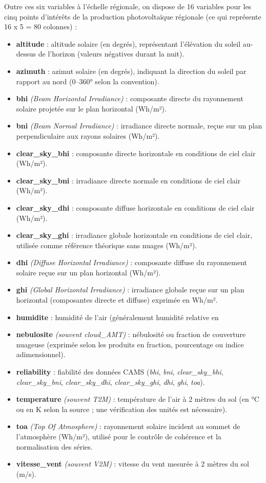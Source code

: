 Outre ces six variables à l’échelle régionale, on dispose de 16 variables pour les cinq points d'intérêts de la production photovoltaïque régionale (ce qui représente 16 x 5 = 80 colonnes) :

\begin{itemize}
\item \textbf{altitude} : altitude solaire (en degrés), représentant l'élévation du soleil au-dessus de l'horizon (valeurs négatives durant la nuit).
\item \textbf{azimuth} : azimut solaire (en degrés), indiquant la direction du soleil par rapport au nord (0–360° selon la convention).
\item \textbf{bhi} \textit{(Beam Horizontal Irradiance)} : composante directe du rayonnement solaire projetée sur le plan horizontal (Wh/m²).
\item \textbf{bni} \textit{(Beam Normal Irradiance)} : irradiance directe normale, reçue sur un plan perpendiculaire aux rayons solaires (Wh/m²).
\item \textbf{clear\_sky\_bhi} : composante directe horizontale en conditions de ciel clair (Wh/m²).
\item \textbf{clear\_sky\_bni} : irradiance directe normale en conditions de ciel clair (Wh/m²).
\item \textbf{clear\_sky\_dhi} : composante diffuse horizontale en conditions de ciel clair (Wh/m²).
\item \textbf{clear\_sky\_ghi} : irradiance globale horizontale en conditions de ciel clair, utilisée comme référence théorique sans nuages (Wh/m²).
\item \textbf{dhi} \textit{(Diffuse Horizontal Irradiance)} : composante diffuse du rayonnement solaire reçue sur un plan horizontal (Wh/m²).
\item \textbf{ghi} \textit{(Global Horizontal Irradiance)} : irradiance globale reçue sur un plan horizontal (composantes directe et diffuse) exprimée en Wh/m².
\item \textbf{humidite} : humidité de l'air (généralement humidité relative en %
\item \textbf{nebulosite} \textit{(souvent cloud\_AMT)} : nébulosité ou fraction de couverture nuageuse (exprimée selon les produits en fraction, pourcentage ou indice adimensionnel).
\item \textbf{reliability} : fiabilité des données CAMS (\textit{bhi}, \textit{bni}, \textit{clear\_sky\_bhi}, \textit{clear\_sky\_bni}, \textit{clear\_sky\_dhi}, \textit{clear\_sky\_ghi}, \textit{dhi}, \textit{ghi}, \textit{toa}).
\item \textbf{temperature} \textit{(souvent T2M)} : température de l'air à 2 mètres du sol (en °C ou en K selon la source ; une vérification des unités est nécessaire).
\item \textbf{toa} \textit{(Top Of Atmosphere)} : rayonnement solaire incident au sommet de l'atmosphère (Wh/m²), utilisé pour le contrôle de cohérence et la normalisation des séries.
\item \textbf{vitesse\_vent} \textit{(souvent V2M)} : vitesse du vent mesurée à 2 mètres du sol (m/s).
\end{itemize}

